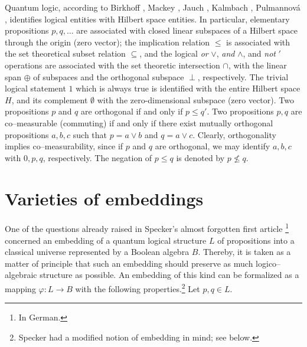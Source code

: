 Quantum logic, according to
Birkhoff \cite{birkhoff-36}, Mackey \cite{ma-57},
Jauch \cite{jauch}, Kalmbach \cite{kalmbach-83},
Pulmannov{\'{a}} \cite{pulmannova-91},
identifies logical entities with Hilbert space entities.
In particular, elementary propositions $p,q,\ldots$  are associated
with closed linear subspaces of a Hilbert space through the origin
(zero vector); the implication relation $\leq$
is associated with the set theoretical subset relation $\subseteq$, and the
logical {\it or} $\vee$, {\it and} $\wedge$, and {\it not} $'$ operations
are associated with the set theoretic intersection $\cap$, with the
linear span $\oplus$ of subspaces and the orthogonal subspace $\perp$,
respectively.
The trivial logical
statement $1$ which is always true is identified with the entire Hilbert
space $H$, and its complement $\emptyset$ with the zero-dimensional
subspace (zero vector).
Two propositions $p$ and $q$ are orthogonal if
and only if $p\leq q'$.
Two propositions $p,q$ are co--measurable (commuting)
if and only if there exist mutually orthogonal propositions  $a,b,c$
such that $p=a\vee b$ and $q=a\vee c$.
Clearly, orthogonality implies co--measurability, since if $p$ and $q$
are orthogonal, we may identify
$a, b, c$ with $0,p,q$, respectively.
The negation of $p\leq q$ is denoted
by $p \not\leq q$.




\section{Varieties of embeddings}

One of the questions already raised in Specker's almost
forgotten first article \cite{specker-60}\footnote{In German.} concerned an
embedding of a quantum logical structure $L$ of propositions into a classical
universe represented by a Boolean algebra $B$. Thereby, it is taken as
a matter of principle that such an embedding should preserve as much
logico--algebraic structure as possible. An embedding of this kind can be
formalized as a mapping $\varphi :L\rightarrow B$  with the following
properties.\footnote{Specker had a modified notion of embedding in mind; see
below.} Let $p,q\in L$.

